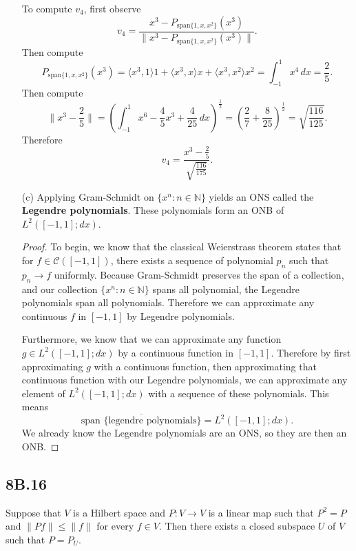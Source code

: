 \documentclass[12pt]{amsart}
\newcommand{\N}{\mathbb{N}}
\newcommand{\eq}[1]{\begin{equation*}#1\end{equation*}}
\begin{document}
\begin{itemize}
    To compute $v_4$, first observe
    \eq{v_4 = \frac{x^3 - P_{\text{span} \{ 1, x, x^2\}} (x^3)}{ \| x^3 - P_{\text{span} \{ 1, x, x^2\}} (x^3) \|}.}
    Then compute
    \eq{P_{\text{span} \{ 1, x, x^2\}} (x^3) = \langle x^3, 1\rangle 1 + \langle x^3, x\rangle x + \langle x^3, x^2 \rangle x^2 = \int_{-1}^{1} x^4 \,dx = \frac{2}{5}.}
    Then compute 
    \eq{\|x^3 - \frac{2}{5} \| = \left( \int_{-1}^{1} x^6 - \frac{4}{5} x^3 + \frac{4}{25} \,dx\right)^\frac{1}{2} = \left(\frac{2}{7} + \frac{8}{25}\right)^\frac{1}{2} = \sqrt{\frac{116}{125}}.}
    Therefore
    \eq{v_4 = \frac{x^3 - \frac{2}{5}}{\sqrt{\frac{116}{175}}}.}

    \item[(c)] Applying Gram-Schmidt on $\{x^n : n \in \N\}$ yields an ONS called the \textbf{Legendre polynomials}. These polynomials form an ONB of $L^2([-1, 1]; dx)$.
    \begin{proof}
        To begin, we know that the classical Weierstrass theorem states that for $f \in \mathcal{C}([-1, 1])$, there exists a sequence of polynomial $p_n$ such that $p_n \to f$ uniformly. Because Gram-Schmidt preserves the span of a collection, and our collection $\{x^n : n \in \N\}$ spans all polynomial, the Legendre polynomials span all polynomials. Therefore we can approximate any continuous $f$ in $[-1, 1]$ by Legendre polynomials.

        Furthermore, we know that we can approximate any function $g \in L^2([-1, 1]; dx)$ by a continuous function in $[-1, 1]$. Therefore by first approximating $g$ with a continuous function, then approximating that continuous function with our Legendre polynomials, we can approximate any element of $L^2([-1, 1]; dx)$ with a sequence of these polynomials. This means
        \eq{\overline{\text{span \{legendre polynomials\}}} = L^2([-1, 1]; dx).}
        We already know the Legendre polynomials are an ONS, so they are then an ONB.
    \end{proof}
\end{itemize}

\subsection*{8B.16} \hfill

Suppose that $V$ is a Hilbert space and $P: V \to V$ is a linear map such that $P^2 = P$ and $\|Pf\| \leq \|f\|$ for every $f \in V$. Then there exists a closed subspace $U$ of $V$ such that $P = P_U$.
\end{document}

